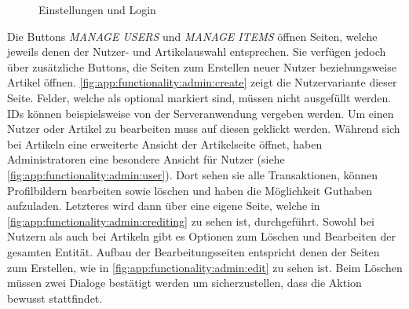 \begin{figure}
	\caption{Einstellungen und Login}%
	\label{fig:app:functionality:various}%
\end{figure}

Die Buttons \textit{MANAGE USERS} und \textit{MANAGE ITEMS} öffnen Seiten, welche jeweils denen der Nutzer- und Artikelauswahl entsprechen.
Sie verfügen jedoch über zusätzliche Buttons, die Seiten zum Erstellen neuer Nutzer beziehungsweise Artikel öffnen.
\autoref{fig:app:functionality:admin:create} zeigt die Nutzervariante dieser Seite.
Felder, welche als optional markiert sind, müssen nicht ausgefüllt werden.
IDs können beispielsweise von der Serveranwendung vergeben werden.
Um einen Nutzer oder Artikel zu bearbeiten muss auf diesen geklickt werden.
Während sich bei Artikeln eine erweiterte Ansicht der Artikelseite öffnet, haben Administratoren eine besondere Ansicht für Nutzer (siehe \autoref{fig:app:functionality:admin:user}).
Dort sehen sie alle Transaktionen, können Profilbildern bearbeiten sowie löschen und haben die Möglichkeit Guthaben aufzuladen.
Letzteres wird dann über eine eigene Seite, welche in \autoref{fig:app:functionality:admin:crediting} zu sehen ist, durchgeführt.
Sowohl bei Nutzern als auch bei Artikeln gibt es Optionen zum Löschen und Bearbeiten der gesamten Entität.
Aufbau der Bearbeitungsseiten entspricht denen der Seiten zum Erstellen, wie in \autoref{fig:app:functionality:admin:edit} zu sehen ist.
Beim Löschen müssen zwei Dialoge bestätigt werden um sicherzustellen, dass die Aktion bewusst stattfindet.
